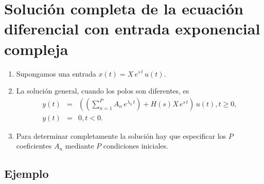 \section{Soluci\'{o}n completa de la ecuaci\'{o}n diferencial con entrada exponencial compleja}

\begin{enumerate}

\item Supongamos una entrada $x(t) = X \, e^{s \, t} \, u(t)$.

\item La soluci\'{o}n general, cuando los polos son diferentes, es 
\begin{eqnarray}
  y\left( t\right)        &=&     
  \left(\left( \sum_{n=1}^{P}A_{n} \, e^{\lambda_{n} \, t}\right) + H\left( s\right) X \, e^{s \, t}\right) \, u(t), t\geq 0, \\
  y\left( t\right)        &=&     0, t<0.
\end{eqnarray}

\item Para determinar completamente la soluci\'{o}n hay que especificar los $P$ coeficientes $A_{n}$ mediante $P$ condiciones iniciales.

\end{enumerate}

\subsection{Ejemplo}

